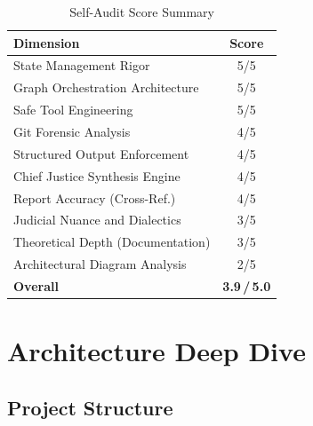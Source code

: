 \documentclass[11pt,a4paper]{article}
\begin{document}
\begin{table}[H]
\centering
\caption{Self-Audit Score Summary}
\begin{tabular}{@{}lc@{}}
\toprule
\textbf{Dimension} & \textbf{Score} \\
\midrule
State Management Rigor           & 5/5 \\
Graph Orchestration Architecture & 5/5 \\
Safe Tool Engineering            & 5/5 \\
Git Forensic Analysis            & 4/5 \\
Structured Output Enforcement    & 4/5 \\
Chief Justice Synthesis Engine   & 4/5 \\
Report Accuracy (Cross-Ref.)     & 4/5 \\
Judicial Nuance and Dialectics   & 3/5 \\
Theoretical Depth (Documentation)& 3/5 \\
Architectural Diagram Analysis   & 2/5 \\
\midrule
\textbf{Overall}                 & \textbf{3.9\,/\,5.0} \\
\bottomrule
\end{tabular}
\end{table}

\section{Architecture Deep Dive}

\subsection{Project Structure}
\end{document}

